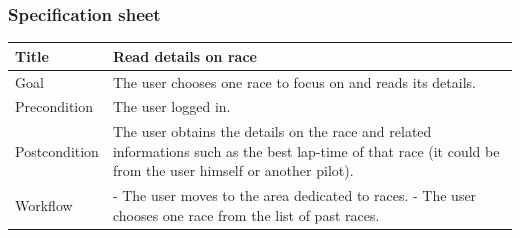 \documentclass{beamer}
\begin{document}
\begin{frame}
    \frametitle{Specification sheet}
    \begin{table}
        \tiny
        \begin{tabular}{|p{2cm}|p{6cm}|}
        \hline
        Title & \textbf{Read details on race} \\
        \hline
        Goal & The user chooses one race to focus on and reads its details. \\
        \hline
        Precondition & The user logged in. \\
        \hline
        Postcondition & The user obtains the details on the race and related informations such as the best lap-time of
        that race (it could be from the user himself or another pilot). \\
        \hline
        Workflow &
        - The user moves to the area dedicated to races. \newline
        - The user chooses one race from the list of past races. \\
        \hline
        \end{tabular}
\end{table}
\end{frame}
\end{document}
